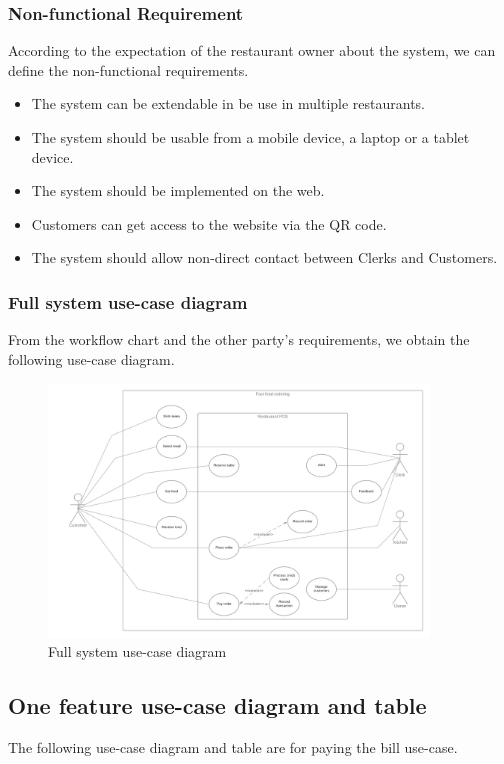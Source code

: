 \documentclass[a4paper]{article}
\numberwithin{equation}{section}
\begin{document}
\subsubsection{Non-functional Requirement}
According to the expectation of the restaurant owner about the system, we can define the non-functional requirements.
\begin{itemize}
  \item The system can be extendable in be use in multiple restaurants.
  \item The system should be usable from a mobile device, a laptop or a tablet device.
  \item The system should be implemented on the web.
  \item Customers can get access to the website via the QR code.
  \item The system should allow non-direct contact between Clerks and Customers.
\end{itemize}

\subsubsection{Full system use-case diagram}
From the workflow chart and the other party's requirements, we obtain the following use-case diagram.

\begin{figure}[H]
  \centering
  \includegraphics[width=0.9\textwidth]{./assets/t1/PieceOfSale.png}
  \caption{Full system use-case diagram}
\end{figure}

\subsection{One feature use-case diagram and table}
The following use-case diagram and table are for paying the bill use-case.
\end{document}
